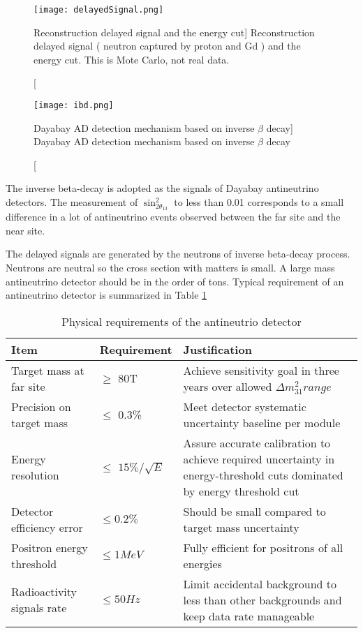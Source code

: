 \begin{figure}
    \label{fig:delayedSignal}
    \centering
    \texttt{[image: delayedSignal.png]}
    \caption
    [Reconstruction delayed signal and the energy cut]
    {Reconstruction delayed signal ( neutron captured by proton and Gd ) and the energy cut. This is Mote Carlo, not real data.}
    \end{figure}



\begin{figure}
    \label{fig:ibd}
    \centering
    \texttt{[image: ibd.png]}
    \caption
    [Dayabay AD detection mechanism based on inverse $\beta$ decay]
    {Dayabay AD detection mechanism based on inverse $\beta$ decay}
    \end{figure}


The inverse beta-decay is adopted as the signals of Dayabay antineutrino detectors.
The measurement of $\sin^{2}_{2\theta_{13}}$ to less than 0.01 corresponds to a small
difference in a lot of antineutrino events observed between the far site and
the near site.

The delayed signals are generated by the neutrons of inverse beta-decay process.
Neutrons are neutral so the cross section with matters is small.
A large mass antineutrino detector should be in the order of tons.
Typical requirement of an antineutrino detector is summarized in Table \ref{tab:ADRequirement}


\begin{table}
\centering
\caption{Physical requirements of the antineutrio detector\cite{TDR}}
\label{tab:ADRequirement}
\begin{tabular}{lp{2.5cm}p{5.0cm}}
\hline
Item & Requirement & Justification\\
\hline
\hline
Target mass at far site &
$\geq$ 80T &
Achieve sensitivity goal in three years over allowed ${\Delta}m^{2}_31 range$ \\
\hline
Precision on target mass &
$\leq$ 0.3\% &
Meet detector systematic uncertainty baseline per module \\
\hline
Energy resolution &
$\leq$ $15\%/\sqrt{E}$ &
Assure accurate calibration to achieve required uncertainty in energy-threshold cuts dominated by energy threshold cut \\
\hline
Detector efficiency error &
$\leq 0.2\%$ &
Should be small compared to target mass uncertainty \\
\hline
Positron energy threshold &
$\leq 1MeV$ &
Fully efficient for positrons of all energies \\
Radioactivity signals rate &
$\leq 50 Hz$ &
Limit accidental background to less than other backgrounds and keep data rate manageable \\
\hline
\end{tabular}
\end{table}



